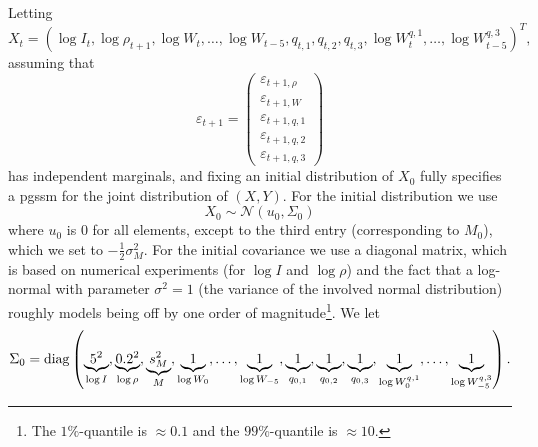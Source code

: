 Letting $$X_{t} =\left( \log I_{t}, \log \rho_{t + 1}, \log W_{t}, \dots, \log W_{t - 5}, q_{t,1}, q_{t,2}, q_{t,3}, \log W^{q,1}_{t}, \dots, \log W^{q,3}_{t - 5}\right)^{T},$$ assuming that
$$
\varepsilon_{t + 1} = 
\begin{pmatrix}
     \varepsilon_{t + 1,\rho}\\ \varepsilon_{t + 1, W}\\ \varepsilon_{t +1, q, 1}\\ \varepsilon_{t +1, q, 2}\\ \varepsilon_{t +1, q, 3}
\end{pmatrix}
$$
has independent marginals, and fixing an initial distribution of $X_{0}$ fully specifies a \acrshort{pgssm} for the joint distribution of $(X,Y)$. For the initial distribution we use 
$$
    X_{0} \sim \mathcal N \left( u_{0}, \Sigma_{0} \right)
$$
where $u_{0}$ is $0$ for all elements, except to the third entry (corresponding to $M_{0}$), which we set to $-\frac{1}{2} \sigma^{2}_M$. For the initial covariance we use a diagonal matrix, which is based on numerical experiments (for $\log I$ and $\log \rho$) and the fact that a log-normal with parameter $\sigma^{2} = 1$ (the variance of the involved normal distribution) roughly models being off by one order of magnitude\footnote{The $1\%$-quantile is $\approx 0.1$ and the $99\%$-quantile is $\approx 10$.}. We let
$$
    \Sigma_{0} = \operatorname{diag} \left( 
        \underbrace{5^{2}}_{\log I},
        \underbrace{0.2^{2}}_{\log \rho},
        \underbrace{s^{2}_M}_{M},
        \underbrace{1}_{\log W_{0}},
        \dots,
        \underbrace{1}_{\log W_{-5}},
        \underbrace{1}_{q_{0, 1}},
        \underbrace{1}_{q_{0, 2}},
        \underbrace{1}_{q_{0, 3}},
        \underbrace{1}_{\log W^{q,1}_{0}},
        \dots,
        \underbrace{1}_{\log W^{q,3}_{-5}}
    \right).
$$

